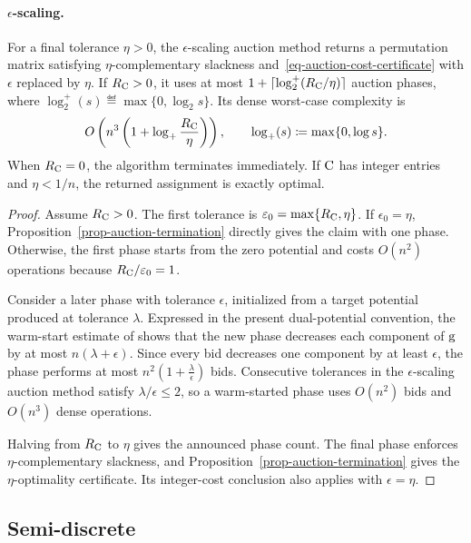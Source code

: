 \paragraph{\texorpdfstring{$\epsilon$-scaling.}{epsilon-scaling.}}
\begin{prop}\label{prop-auction-epsilon-scaling}
For a final tolerance $\eta>0$, the $\epsilon$-scaling auction method returns a permutation matrix satisfying $\eta$-complementary slackness and~\eqref{eq-auction-cost-certificate} with $\epsilon$ replaced by $\eta$. If $R_{\mathrm{C}}>0$, it uses at most
$1+\lceil\log_2^+(R_{\mathrm{C}}/\eta)\rceil$ auction phases, where
$\log_2^+(s)\eqdef\max\{0,\log_2 s\}$. Its dense worst-case complexity is
\[
O\left(n^3\left(1+\log_+\frac{R_{\mathrm{C}}}{\eta}\right)\right),
\qquad
\log_+(s)\coloneqq\max\{0,\log s\}.
\]
When $R_{\mathrm{C}}=0$, the algorithm terminates immediately. If $\mathrm{C}$ has integer entries and $\eta<1/n$, the returned assignment is exactly optimal.
\end{prop}
\begin{proof}
Assume $R_{\mathrm{C}}>0$. The first tolerance is $\varepsilon_0=\max\{R_{\mathrm{C}},\eta\}$. If $\epsilon_0=\eta$, Proposition~\ref{prop-auction-termination} directly gives the claim with one phase. Otherwise, the first phase starts from the zero potential and costs $O(n^2)$ operations because $R_{\mathrm{C}}/\varepsilon_0=1$.

Consider a later phase with tolerance $\epsilon$, initialized from a target potential produced at tolerance $\lambda$. Expressed in the present dual-potential convention, the warm-start estimate of shows that the new phase decreases each component of $\mathrm{g}$ by at most $n(\lambda+\epsilon)$. Since every bid decreases one component by at least $\epsilon$, the phase performs at most
\(n^2\left(1+\frac{\lambda}{\epsilon}\right)\)
bids. Consecutive tolerances in the $\epsilon$-scaling auction method satisfy $\lambda/\epsilon\leq2$, so a warm-started phase uses $O(n^2)$ bids and $O(n^3)$ dense operations.

Halving from $R_{\mathrm{C}}$ to $\eta$ gives the announced phase count. The final phase enforces $\eta$-complementary slackness, and Proposition~\ref{prop-auction-termination} gives the $\eta$-optimality certificate. Its integer-cost conclusion also applies with $\epsilon=\eta$.
\end{proof}
\subsection{Semi-discrete}
